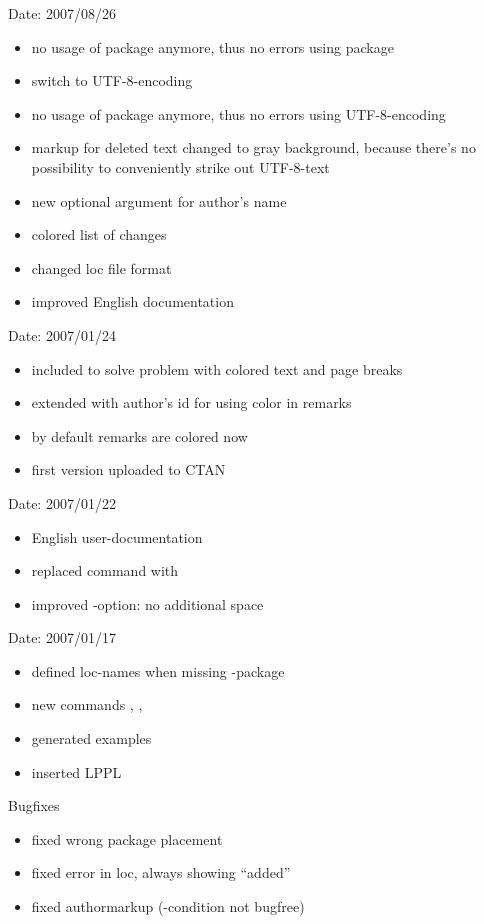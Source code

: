 Date: 2007/08/26
\begin{itemize}
	\item no usage of package  anymore, thus no errors using package 
	\item switch to UTF-8-encoding
	\item no usage of package  anymore, thus no errors using UTF-8-encoding
	\item markup for deleted text changed to gray background, because there's no possibility to conveniently strike out UTF-8-text
	\item new optional argument for author's name
	\item colored list of changes
	\item changed loc file format
	\item improved English documentation
\end{itemize}


Date: 2007/01/24
\begin{itemize}
	\item included  to solve problem with colored text and page breaks
	\item extended  with author's id for using color in remarks
	\item by default remarks are colored now
	\item first version uploaded to CTAN
\end{itemize}


Date: 2007/01/22
\begin{itemize}
	\item English user-documentation
	\item replaced command  with 
	\item improved -option: no additional space
\end{itemize}


Date: 2007/01/17
\begin{itemize}
	\item defined loc-names when missing -package
	\item new commands , , 
	\item generated examples
	\item inserted LPPL
\end{itemize}
Bugfixes
\begin{itemize}
	\item fixed wrong  package placement
	\item fixed error in loc, always showing ``added''
	\item fixed authormarkup (-condition not bugfree)
\end{itemize}

